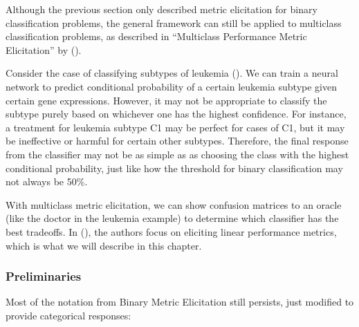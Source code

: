 \documentclass[
  letterpaper,
  numbers=noenddot,
  DIV=11]{scrreprt}
\theoremstyle{definition}
\theoremstyle{plain}
\theoremstyle{plain}
\theoremstyle{remark}
\begin{document}
Although the previous section only described metric elicitation for
binary classification problems, the general framework can still be
applied to multiclass classification problems, as described in
``Multiclass Performance Metric Elicitation'' by
().

Consider the case of classifying subtypes of leukemia
(). We can
train a neural network to predict conditional probability of a certain
leukemia subtype given certain gene expressions. However, it may not be
appropriate to classify the subtype purely based on whichever one has
the highest confidence. For instance, a treatment for leukemia subtype
C1 may be perfect for cases of C1, but it may be ineffective or harmful
for certain other subtypes. Therefore, the final response from the
classifier may not be as simple as as choosing the class with the
highest conditional probability, just like how the threshold for binary
classification may not always be 50\%.

With multiclass metric elicitation, we can show confusion matrices to an
oracle (like the doctor in the leukemia example) to determine which
classifier has the best tradeoffs. In
(), the
authors focus on eliciting linear performance metrics, which is what we
will describe in this chapter.

\subsubsection*{Preliminaries}\label{preliminaries}

Most of the notation from Binary Metric Elicitation still persists, just
modified to provide categorical responses:
\end{document}
